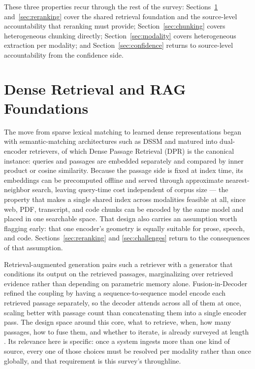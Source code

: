 \documentclass[conference]{IEEEtran}
\begin{document}
These three properties recur through the rest of the survey: Sections~\ref{sec:foundations} and~\ref{sec:reranking} cover the shared retrieval foundation and the source-level accountability that reranking must provide; Section~\ref{sec:chunking} covers heterogeneous chunking directly; Section~\ref{sec:modality} covers heterogeneous extraction per modality; and Section~\ref{sec:confidence} returns to source-level accountability from the confidence side.

\section{Dense Retrieval and RAG Foundations}
\label{sec:foundations}

The move from sparse lexical matching to learned dense representations began with semantic-matching architectures such as DSSM \cite{huang2013dssm} and matured into dual-encoder retrievers, of which Dense Passage Retrieval (DPR) \cite{karpukhin2020dpr} is the canonical instance: queries and passages are embedded separately and compared by inner product or cosine similarity. Because the passage side is fixed at index time, its embeddings can be precomputed offline and served through approximate nearest-neighbor search, leaving query-time cost independent of corpus size — the property that makes a single shared index across modalities feasible at all, since web, PDF, transcript, and code chunks can be encoded by the same model and placed in one searchable space. That design also carries an assumption worth flagging early: that one encoder's geometry is equally suitable for prose, speech, and code. Sections~\ref{sec:reranking} and \ref{sec:challenges} return to the consequences of that assumption.

Retrieval-augmented generation \cite{lewis2020rag} pairs such a retriever with a generator that conditions its output on the retrieved passages, marginalizing over retrieved evidence rather than depending on parametric memory alone. Fusion-in-Decoder \cite{izacard2021fid} refined the coupling by having a sequence-to-sequence model encode each retrieved passage separately, so the decoder attends across all of them at once, scaling better with passage count than concatenating them into a single encoder pass. The design space around this core, what to retrieve, when, how many passages, how to fuse them, and whether to iterate, is already surveyed at length \cite{gao2023ragsurvey}. Its relevance here is specific: once a system ingests more than one kind of source, every one of those choices must be resolved per modality rather than once globally, and that requirement is this survey's throughline.
\end{document}
